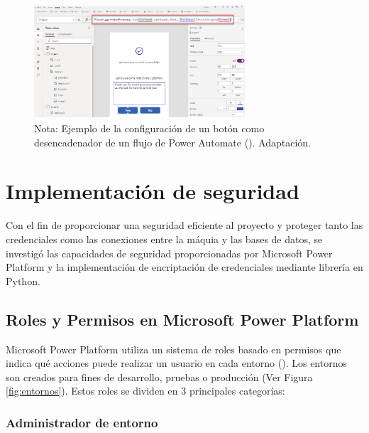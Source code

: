 \documentclass[letter,oneside,12pt,spanish]{report}
\begin{document}
\begin{figure}[ht]
    \centering
    \includegraphics[width=0.7\textwidth]{Figs/boton que ejecuta flujo.png}
    \label{fig:button}
    \\Nota:  Ejemplo de la configuración de un botón como desencadenador de un flujo de Power Automate (\cite{tapanm2024powerapps}). Adaptación.
\end{figure}

\section{Implementación de seguridad}


\noindent Con el fin de proporcionar una seguridad eficiente al proyecto y proteger tanto las credenciales como las conexiones entre la máquia y las bases de datos, se investigó las capacidades de seguridad proporcionadas por Microsoft Power Platform y la implementación de encriptación de credenciales mediante librería en Python. 

\subsection{Roles y Permisos en Microsoft Power Platform}

\noindent Microsoft Power Platform utiliza un sistema de roles basado en permisos que indica qué acciones puede realizar un usuario en cada entorno (\cite{microsoft2024environments}). Los entornos son creados para fines de desarrollo, pruebas o producción (Ver Figura \ref{fig:entornos}). Estos roles se dividen en 3 principales categorías:

\subsubsection{Administrador de entorno}
\end{document}
